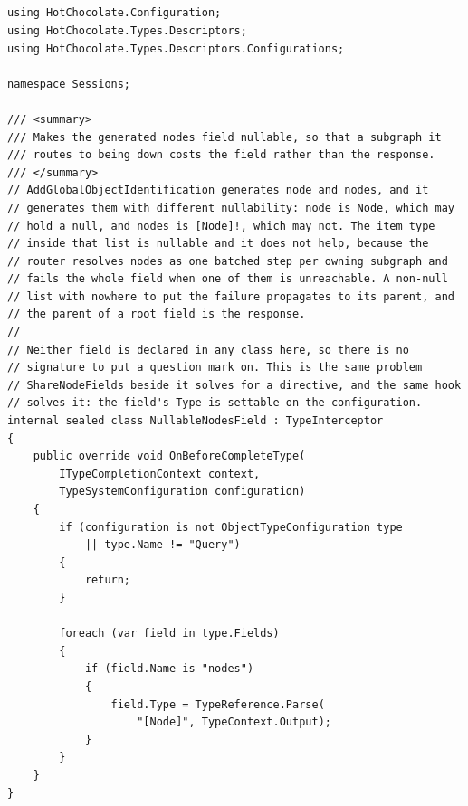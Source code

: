 \subsection*{}
\begin{verbatim}
using HotChocolate.Configuration;
using HotChocolate.Types.Descriptors;
using HotChocolate.Types.Descriptors.Configurations;

namespace Sessions;

/// <summary>
/// Makes the generated nodes field nullable, so that a subgraph it
/// routes to being down costs the field rather than the response.
/// </summary>
// AddGlobalObjectIdentification generates node and nodes, and it
// generates them with different nullability: node is Node, which may
// hold a null, and nodes is [Node]!, which may not. The item type
// inside that list is nullable and it does not help, because the
// router resolves nodes as one batched step per owning subgraph and
// fails the whole field when one of them is unreachable. A non-null
// list with nowhere to put the failure propagates to its parent, and
// the parent of a root field is the response.
//
// Neither field is declared in any class here, so there is no
// signature to put a question mark on. This is the same problem
// ShareNodeFields beside it solves for a directive, and the same hook
// solves it: the field's Type is settable on the configuration.
internal sealed class NullableNodesField : TypeInterceptor
{
    public override void OnBeforeCompleteType(
        ITypeCompletionContext context,
        TypeSystemConfiguration configuration)
    {
        if (configuration is not ObjectTypeConfiguration type
            || type.Name != "Query")
        {
            return;
        }

        foreach (var field in type.Fields)
        {
            if (field.Name is "nodes")
            {
                field.Type = TypeReference.Parse(
                    "[Node]", TypeContext.Output);
            }
        }
    }
}
\end{verbatim}

